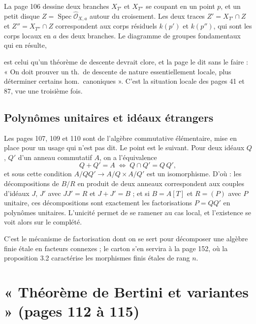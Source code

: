 \documentclass[11pt,a4paper]{article}
\begin{document}
La page 106 dessine deux branches $X_{T'}$ et $X_{T''}$ se coupant en un point
$p$, et un petit disque $Z = \operatorname{Spec}
\hat{\mathcal{O}}_{X,a}$ autour du croisement. Les deux traces
$Z' = X_{T'} \cap Z$ et $Z'' = X_{T''} \cap Z$ correspondent aux corps
résiduels $k(p')$ et $k(p'')$, qui sont les corps locaux en $a$ des deux
branches. Le diagramme de groupes fondamentaux qui en résulte,


est celui qu'un théorème de descente devrait clore, et la page le dit sans le
faire : « On doit prouver un th.\ de descente de nature essentiellement locale,
plus déterminer certains hom.\ canoniques ». C'est la situation locale des
pages 41 et 87, vue une troisième fois.

\subsection*{Polynômes unitaires et idéaux étrangers}

Les pages 107, 109 et 110 sont de l'algèbre commutative élémentaire, mise en
place pour un usage qui n'est pas dit. Le point est le suivant. Pour deux
idéaux $Q$, $Q'$ d'un anneau commutatif $A$, on a l'équivalence
\[
  Q + Q' = A \;\Longleftrightarrow\; Q \cap Q' = Q\,Q' ,
\]
et sous cette condition $A/QQ' \to A/Q \times A/Q'$ est un isomorphisme. D'où :
les décompositions de $B/R$ en produit de deux anneaux correspondent aux
couples d'idéaux $J$, $J'$ avec $JJ' = R$ et $J + J' = B$ ; et si $B = A[T]$ et
$R = (P)$ avec $P$ unitaire, ces décompositions sont exactement les
factorisations $P = QQ'$ en polynômes unitaires. L'unicité permet de se ramener
au cas local, et l'existence se voit alors sur le complété.

C'est le mécanisme de factorisation dont on se sert pour décomposer une algèbre
finie étale en facteurs connexes ; le carton s'en servira à la page 152, où la
proposition 3.2 caractérise les morphismes finis étales de rang $n$.

\section*{« Théorème de Bertini et variantes » (pages 112 à 115)}
\end{document}
